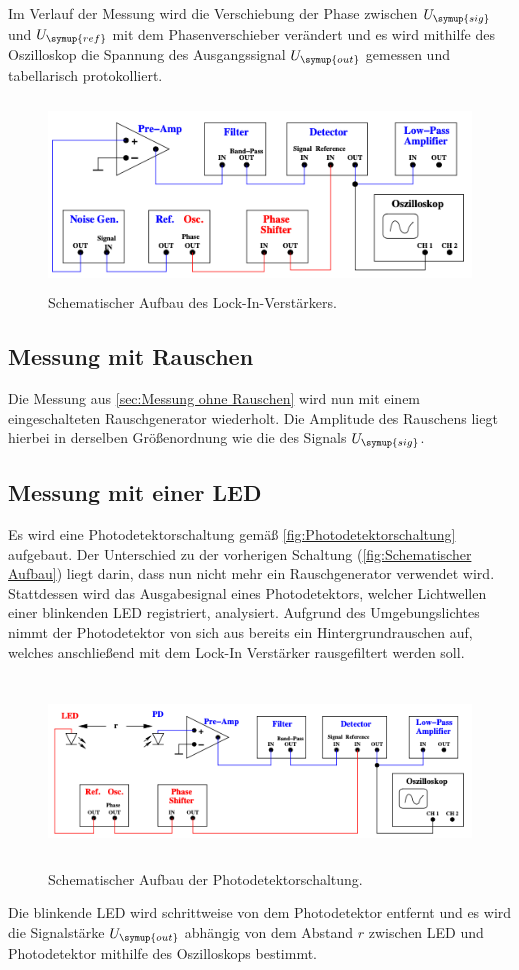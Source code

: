 Im Verlauf der Messung wird die Verschiebung der Phase zwischen $U_{\symup{sig}}$ und $U_{\symup{ref}}$ mit dem Phasenverschieber
verändert und es wird mithilfe des Oszilloskop die Spannung des Ausgangssignal $U_{\symup{out}}$ gemessen und tabellarisch
protokolliert.

\begin{figure} [H]
    \centering
    \includegraphics[height=5cm]{content/Bilder/Aufbau_Schema.png}
    \caption{Schematischer Aufbau des Lock-In-Verstärkers.\cite{v303}}
    \label{fig:Schematischer Aufbau}
\end{figure}

\subsection{Messung mit Rauschen}
\label{sec:Messung mit Rauschen}
Die Messung aus \ref{sec:Messung ohne Rauschen} wird nun mit einem eingeschalteten Rauschgenerator wiederholt. Die Amplitude
des Rauschens liegt hierbei in derselben Größenordnung wie die des Signals $U_{\symup{sig}}$.


\subsection{Messung mit einer LED}
\label{sec:Messung mit einer LED}
Es wird eine Photodetektorschaltung gemäß \autoref{fig:Photodetektorschaltung} aufgebaut. Der Unterschied zu der vorherigen 
Schaltung (\autoref{fig:Schematischer Aufbau}) liegt darin, dass nun nicht mehr ein Rauschgenerator verwendet wird. Stattdessen
wird das Ausgabesignal eines Photodetektors, welcher Lichtwellen einer blinkenden LED registriert, analysiert.
Aufgrund des Umgebungslichtes nimmt der Photodetektor von sich aus bereits ein Hintergrundrauschen auf, welches
anschließend mit dem Lock-In Verstärker rausgefiltert werden soll.

\begin{figure} [H]
    \centering
    \includegraphics[height=5cm]{content/Bilder/Aufbau_led.png}
    \caption{Schematischer Aufbau der Photodetektorschaltung.\cite{v303}}
    \label{fig:Photodetektorschaltung}
\end{figure}

Die blinkende LED wird schrittweise von dem Photodetektor entfernt und es wird die Signalstärke $U_{\symup{out}}$ abhängig von dem 
Abstand $r$ zwischen LED und Photodetektor mithilfe des Oszilloskops bestimmt.